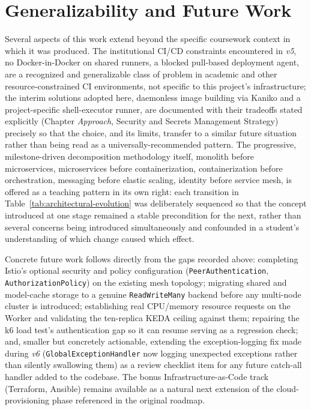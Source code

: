 \documentclass[twoside]{supsistudent}
\begin{document}
\section{Generalizability and Future Work}
Several aspects of this work extend beyond the specific coursework context in which it was produced. The institutional CI/CD constraints encountered in \emph{v5}, no Docker-in-Docker on shared runners, a blocked pull-based deployment agent, are a recognized and generalizable class of problem in academic and other resource-constrained CI environments, not specific to this project's infrastructure; the interim solutions adopted here, daemonless image building via Kaniko and a project-specific shell-executor runner, are documented with their tradeoffs stated explicitly (Chapter \emph{Approach}, Security and Secrets Management Strategy) precisely so that the choice, and its limits, transfer to a similar future situation rather than being read as a universally-recommended pattern. The progressive, milestone-driven decomposition methodology itself, monolith before microservices, microservices before containerization, containerization before orchestration, messaging before elastic scaling, identity before service mesh, is offered as a teaching pattern in its own right: each transition in Table~\ref{tab:architectural-evolution} was deliberately sequenced so that the concept introduced at one stage remained a stable precondition for the next, rather than several concerns being introduced simultaneously and confounded in a student's understanding of which change caused which effect.

Concrete future work follows directly from the gaps recorded above: completing Istio's optional security and policy configuration (\texttt{PeerAuthentication}, \texttt{AuthorizationPolicy}) on the existing mesh topology; migrating shared and model-cache storage to a genuine \texttt{ReadWriteMany} backend before any multi-node cluster is introduced; establishing real CPU/memory resource requests on the Worker and validating the ten-replica KEDA ceiling against them; repairing the k6 load test's authentication gap so it can resume serving as a regression check; and, smaller but concretely actionable, extending the exception-logging fix made during \emph{v6} (\texttt{GlobalExceptionHandler} now logging unexpected exceptions rather than silently swallowing them) as a review checklist item for any future catch-all handler added to the codebase. The bonus Infrastructure-as-Code track (Terraform, Ansible) remains available as a natural next extension of the cloud-provisioning phase referenced in the original roadmap.
\end{document}
